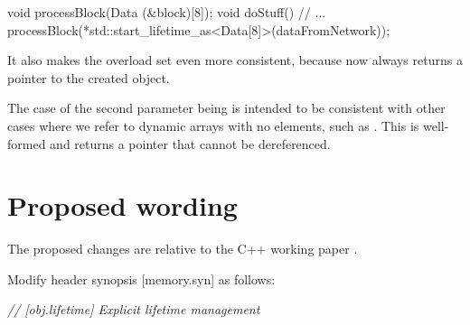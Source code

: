 \begin{codeblock}
void processBlock(Data (&block)[8]);
void doStuff() {
  // ...
  processBlock(*std::start_lifetime_as<Data[8]>(dataFromNetwork));
}
\end{codeblock}
It also makes the overload set even more consistent, because now  always returns a pointer to the created object.

The case of the second parameter being  is intended to be consistent with other cases where we refer to dynamic arrays with no elements, such as . This is well-formed and returns a pointer that cannot be dereferenced.
\section{Proposed wording}
\label{sec:wording}

The proposed changes are relative to the C++ working paper \cite{N4917}.

Modify header  synopsis [memory.syn] as follows:

\begin{adjustwidth}{0.5cm}{0.5cm}

\small\emph{// [obj.lifetime] Explicit lifetime management} \\
\small{} \\
\small{} \\
\small{} \\
\small{} \\
\small{} \\
\small{} \\
\small{} \\
\small{}

\small{} \\
\small{} \\
\small{} \\
\small{} \\
\small{} \\
\small{} \\
\small{} \\
\small{}
\end{adjustwidth}
\vspace{3mm}

